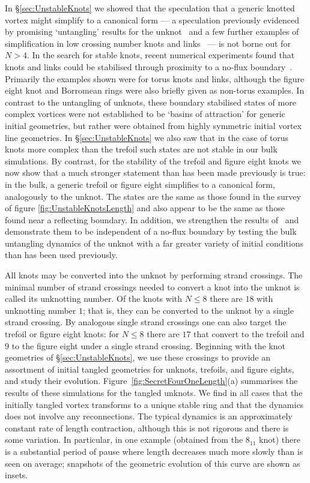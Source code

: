 In \S \ref{sec:UnstableKnots} we showed that the speculation that a generic knotted vortex might simplify to a canonical form --- a speculation previously evidenced by promising `untangling' results for the unknot~\citep{Maucher2016} and a few further examples of simplification in low crossing number knots and links~\citep{Sutcliffe2003,Maucher2019} --- is not borne out for $N>4$. In the search for stable knots, recent numerical experiments found that knots and links could be stabilised through proximity to a no-flux boundary~\citep{Sutcliffe2003,Maucher2017}. Primarily the examples shown were for torus knots and links, although the figure eight knot and Borromean rings were also briefly given as non-torus examples. In contrast to the untangling of unknots, these boundary stabilised states of more complex vortices were not established to be `basins of attraction' for generic initial geometries, but rather were obtained from highly symmetric initial vortex line geometries. In \S \ref{sec:UnstableKnots} we also saw that in the case of torus knots more complex than the trefoil such states are not stable in our bulk simulations. By contrast, for the stability of the trefoil and figure eight knots we now show that a much stronger statement than has been made previously is true: in the bulk, a generic trefoil or figure eight simplifies to a canonical form, analogously to the unknot. The states are the same as those found in the survey of figure \ref{fig:UnstableKnotsLength} and also appear to be the same as those found near a reflecting boundary. In addition, we strengthen the results of~\citep{Maucher2016} and demonstrate them to be independent of a no-flux boundary by testing the bulk untangling dynamics of the unknot with a far greater variety of initial conditions than has been used previously.

All knots may be converted into the unknot by performing strand crossings. The minimal number of strand crossings needed to convert a knot into the unknot is called its unknotting number. Of the knots with $N\leq8$ there are $18$ with unknotting number $1$; that is, they can be converted to the unknot by a single strand crossing. By analogous single strand crossings one can also target the trefoil or figure eight knots: for $N\leq8$ there are $17$ that convert to the trefoil and $9$ to the figure eight under a single strand crossing. Beginning with the knot geometries of \S \ref{sec:UnstableKnots}, we use these crossings to provide an assortment of initial tangled geometries for unknots, trefoils, and figure eights, and study their evolution. Figure~\ref{fig:SecretFourOneLength}(a) summarises the results of these simulations for the tangled unknots. We find in all cases that the initially tangled vortex transforms to a unique stable ring and that the dynamics does not involve any reconnections. The typical dynamics is an approximately constant rate of length contraction, although this is not rigorous and there is some variation. In particular, in one example (obtained from the $8_{11}$ knot) there is a substantial period of pause where length decreases much more slowly than is seen on average; snapshots of the geometric evolution of this curve are shown as insets. 

